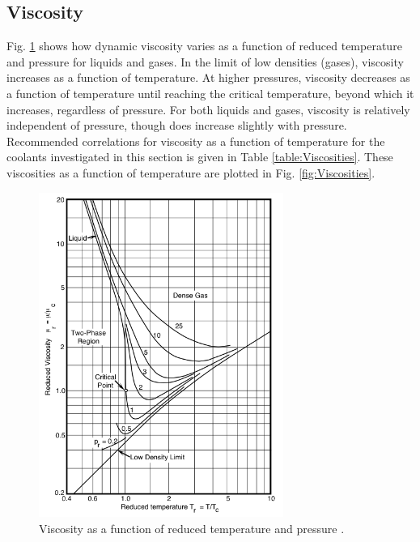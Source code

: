 \documentclass[10pt]{article}
\numberwithin{equation}{section} %
\begin{document}
\subsection{Viscosity}

Fig. \ref{fig:viscosity} shows how dynamic viscosity varies as a function of reduced temperature and pressure for liquids and gases. In the limit of low densities (gases), viscosity increases as a function of temperature. At higher pressures, viscosity decreases as a function of temperature until reaching the critical temperature, beyond which it increases, regardless of pressure. For both liquids and gases, viscosity is relatively independent of pressure, though does increase slightly with pressure. Recommended correlations for viscosity as a function of temperature for the coolants investigated in this section is given in Table \ref{table:Viscosities}. These viscosities as a function of temperature are plotted in Fig. \ref{fig:Viscosities}.

\begin{figure}[H]
  \centering
  \includegraphics[width=8cm]{figures/Viscosity.pdf}
  \caption{Viscosity as a function of reduced temperature and pressure \cite{bird}.}
  \label{fig:viscosity}
\end{figure}
\end{document}
